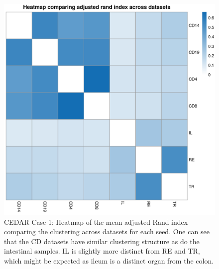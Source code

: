 \documentclass[14pt]{extarticle} %
\begin{document}
	\begin{figure}[h]
		\centering
		\includegraphics[scale=0.75]{Images/Biology_data/Set_250/All_datasets/Arandi_heatmap.png}
		\caption{CEDAR Case 1: Heatmap of the mean adjusted Rand index comparing the clustering across datasets for each seed. One can see that the CD datasets have similar clustering structure as do the intestinal samples. IL is slightly more distinct from RE and TR, which might be expected as ileum is a distinct organ from the colon.}
		\label{fig:results:cedar_1:mdi_adj_rand_ind_heatmap}
	\end{figure}
	
	\newpage
	
\end{document}
